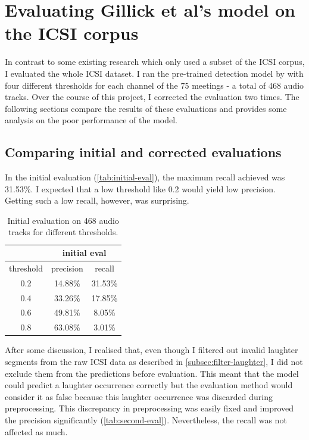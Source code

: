 \documentclass[bsc,frontabs,parskip,deptreport]{infthesis}
\begin{document}
\section{Evaluating Gillick et al's model on the ICSI corpus}
In contrast to some existing research \citep{kennedy2004laughter, knox2006automatic} which only used a subset of the ICSI corpus, I evaluated the whole ICSI dataset.
I ran the pre-trained detection model by \citet{gillick2021robust} with four different thresholds for each channel of the 75 meetings - a total of 468 audio tracks. 
Over the course of this project, I corrected the evaluation two times.
The following sections compare the results of these evaluations and provides some analysis on the poor performance of the model.

\subsection{Comparing initial and corrected evaluations}
In the initial evaluation (\autoref{tab:initial-eval}), the maximum recall achieved was 31.53\%. I expected that a low threshold like 0.2 would yield low precision. Getting such a low recall, however, was surprising. 
\begin{table}[h!]
    \centering
    \begin{tabular}{|c|c|c|}
    \hline
    & \multicolumn{2}{|c|}{initial eval} \\ 
    \hline 
    threshold & precision & recall \\
    \hline
        0.2 &  14.88\% & 31.53\% \\ 
        0.4 &  33.26\% & 17.85\% \\
        0.6 &  49.81\% & 8.05\%  \\
        0.8 &  63.08\% & 3.01\%  \\
     \hline
    \end{tabular}
    \caption{Initial evaluation on 468 audio tracks for different thresholds.}
    \label{tab:initial-eval}
\end{table}



After some discussion, I realised that, even though I filtered out invalid laughter segments from the raw ICSI data as described in \autoref{subsec:filter-laughter}, I did not exclude them from the predictions before evaluation. 
This meant that the model could predict a laughter occurrence correctly but the evaluation method would consider it as false because this laughter occurrence was discarded during preprocessing.
This discrepancy in preprocessing was easily fixed and improved the precision significantly (\autoref{tab:second-eval}). Nevertheless, the recall was not affected as much. 
\end{document}
